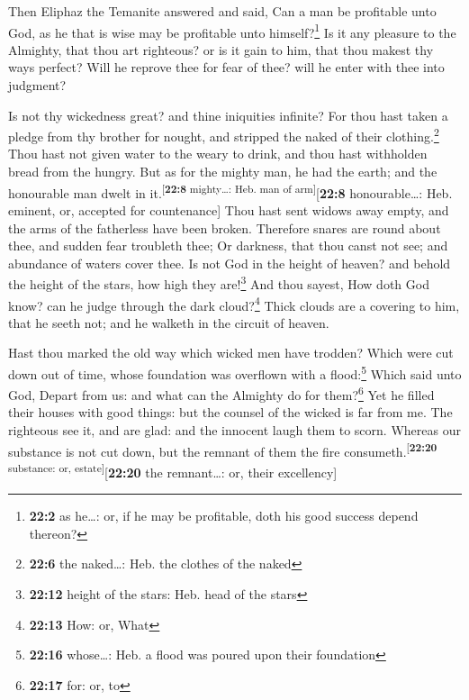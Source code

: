  Then Eliphaz the Temanite answered and said,
 Can a man be profitable unto God, as he that is wise may
be profitable unto himself?\footnote{\textbf{22:2} as he\ldots: or, if
  he may be profitable, doth his good success depend thereon?}
 Is it any pleasure to the Almighty, that thou art
righteous? or is it gain to him, that thou makest thy ways perfect?
 Will he reprove thee for fear of thee? will he enter with
thee into judgment?

 Is not thy wickedness great? and thine iniquities
infinite?  For thou hast taken a pledge from thy brother
for nought, and stripped the naked of their clothing.\footnote{\textbf{22:6}
  the naked\ldots: Heb. the clothes of the naked}  Thou
hast not given water to the weary to drink, and thou hast withholden
bread from the hungry.  But as for the mighty man, he had
the earth; and the honourable man dwelt in
it.\textsuperscript{{[}\textbf{22:8} mighty\ldots: Heb. man of
arm{]}}{[}\textbf{22:8} honourable\ldots: Heb. eminent, or, accepted for
countenance{]}  Thou hast sent widows away empty, and the
arms of the fatherless have been broken.  Therefore
snares are round about thee, and sudden fear troubleth thee;
 Or darkness, that thou canst not see; and abundance of
waters cover thee.  Is not God in the height of heaven?
and behold the height of the stars, how high they are!\footnote{\textbf{22:12}
  height of the stars: Heb. head of the stars}  And thou
sayest, How doth God know? can he judge through the dark
cloud?\footnote{\textbf{22:13} How: or, What}  Thick
clouds are a covering to him, that he seeth not; and he walketh in the
circuit of heaven.

 Hast thou marked the old way which wicked men have
trodden?  Which were cut down out of time, whose
foundation was overflown with a flood:\footnote{\textbf{22:16}
  whose\ldots: Heb. a flood was poured upon their foundation}
 Which said unto God, Depart from us: and what can the
Almighty do for them?\footnote{\textbf{22:17} for: or, to}
 Yet he filled their houses with good things: but the
counsel of the wicked is far from me.  The righteous see
it, and are glad: and the innocent laugh them to scorn. 
Whereas our substance is not cut down, but the remnant of them the fire
consumeth.\textsuperscript{{[}\textbf{22:20} substance: or,
estate{]}}{[}\textbf{22:20} the remnant\ldots: or, their excellency{]}

